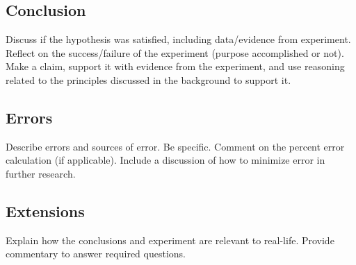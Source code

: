 \documentclass[stu,biblatex,floatsintext,draftall]{apa7}
\begin{document}
\subsection{Conclusion}
Discuss if the hypothesis was satisfied, including data/evidence from experiment. Reflect on the success/failure of the experiment (purpose accomplished or not). Make a claim, support it with evidence from the experiment, and use reasoning related to the principles discussed in the background to support it.

\subsection{Errors}
Describe errors and sources of error. Be specific. Comment on the percent error calculation (if applicable).  Include a discussion of how to minimize error in further research. 

\subsection{Extensions}
Explain how the conclusions and experiment are relevant to real-life.  Provide commentary to answer required questions. 

\printbibliography
\end{document}
